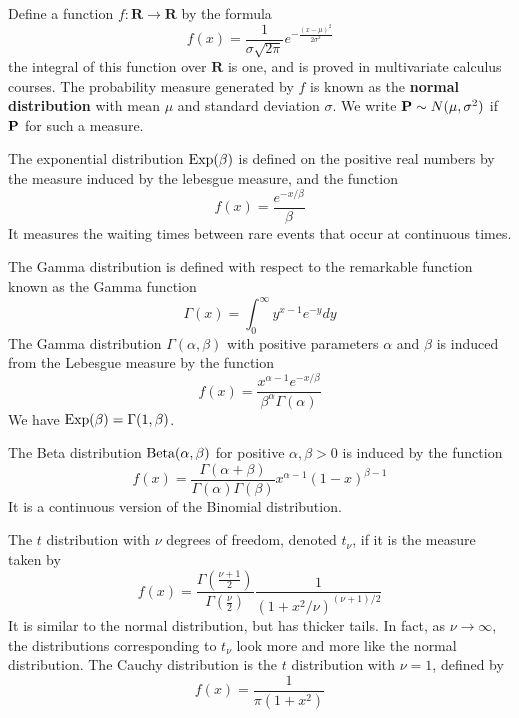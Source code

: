 \begin{example}
    Define a function $f:\mathbf{R} \to \mathbf{R}$ by the formula
    \[ f(x) = \frac{1}{\sigma \sqrt{2\pi}} e^{-\frac{(x - \mu)^2}{2\sigma^2}} \]
    the integral of this function over $\mathbf{R}$ is one, and is proved in multivariate calculus courses. The probability measure generated by $f$ is known as the {\bf normal distribution} with mean $\mu$ and standard deviation $\sigma$. We write $\operatorname{\mathbf{P}} \sim N(\mu, \sigma^2)$ if $\operatorname{\mathbf{P}}$ for such a measure.
\end{example}

\begin{example}
    The exponential distribution $\operatorname{\text{Exp}}(\beta)$ is defined on the positive real numbers by the measure induced by the lebesgue measure, and the function
    \[ f(x) = \frac{e^{-x/\beta}}{\beta} \]
    It measures the waiting times between rare events that occur at continuous times.
\end{example}

\begin{example}
    The Gamma distribution is defined with respect to the remarkable function known as the Gamma function
    \[ \Gamma(x) = \int_0^\infty y^{x-1} e^{-y} dy \]
    The Gamma distribution $\Gamma(\alpha, \beta)$ with positive parameters $\alpha$ and $\beta$ is induced from the Lebesgue measure by the function
    \[ f(x) = \frac{x^{\alpha-1} e^{-x/\beta}}{\beta^\alpha \Gamma(\alpha)} \]
    We have $\operatorname{\text{Exp}}(\beta) = \Gamma(1,\beta)$.
\end{example}

\begin{example}
    The Beta distribution $\operatorname{\text{Beta}}(\alpha, \beta)$ for positive $\alpha, \beta > 0$ is induced by the function
    \[ f(x) = \frac{\Gamma(\alpha + \beta)}{\Gamma(\alpha) \Gamma(\beta)} x^{\alpha-1} (1 - x)^{\beta - 1} \]
    It is a continuous version of the Binomial distribution.
\end{example}

\begin{example}
    The $t$ distribution with $\nu$ degrees of freedom, denoted $t_\nu$, if it is the measure taken by
    \[ f(x) = \frac{\Gamma(\frac{\nu + 1}{2})}{\Gamma(\frac{\nu}{2})} \frac{1}{(1 + x^2/\nu)^{(\nu+1)/2}} \]
    It is similar to the normal distribution, but has thicker tails. In fact, as $\nu \to \infty$, the distributions corresponding to $t_\nu$ look more and more like the normal distribution. The Cauchy distribution is the $t$ distribution with $\nu = 1$, defined by
    \[ f(x) = \frac{1}{\pi(1 + x^2)} \]
\end{example}

